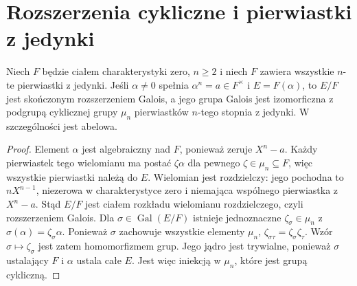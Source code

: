 \section{Rozszerzenia cykliczne i pierwiastki z jedynki}
\begin{lemat}
\label{aa:lem:kummer-simple-galois}
\label{aa:lem:kummer-cyclic}
Niech $F$ będzie ciałem charakterystyki zero,
$n\ge2$ i niech $F$ zawiera wszystkie $n$-te pierwiastki
z jedynki. Jeśli $\alpha\ne0$ spełnia $\alpha^n=a\in F^\times$
i $E=F(\alpha)$, to $E/F$ jest skończonym rozszerzeniem
Galois, a jego grupa Galois jest izomorficzna z podgrupą
cyklicznej grupy $\mu_n$ pierwiastków $n$-tego stopnia
z jedynki. W szczególności jest abelowa.
\end{lemat}
\begin{proof}
Element $\alpha$ jest algebraiczny nad $F$, ponieważ
zeruje $X^n-a$. Każdy pierwiastek tego wielomianu
ma postać $\zeta\alpha$ dla pewnego $\zeta\in\mu_n\subseteq F$,
więc wszystkie pierwiastki należą do $E$.
Wielomian jest rozdzielczy: jego pochodna to
$nX^{n-1}$, niezerowa w charakterystyce zero i
niemająca wspólnego pierwiastka z $X^n-a$.
Stąd $E/F$ jest ciałem rozkładu wielomianu rozdzielczego,
czyli rozszerzeniem Galois.
Dla $\sigma\in\operatorname{Gal}(E/F)$ istnieje jednoznaczne
$\zeta_\sigma\in\mu_n$ z $\sigma(\alpha)=\zeta_\sigma\alpha$.
Ponieważ $\sigma$ zachowuje wszystkie elementy $\mu_n$,
$\zeta_{\sigma\tau}=\zeta_\sigma\zeta_\tau$.
Wzór $\sigma\mapsto\zeta_\sigma$ jest zatem
homomorfizmem grup. Jego jądro jest trywialne,
ponieważ $\sigma$ ustalający $F$ i $\alpha$ ustala całe $E$.
Jest więc iniekcją w $\mu_n$, które jest grupą cykliczną.
\end{proof}

